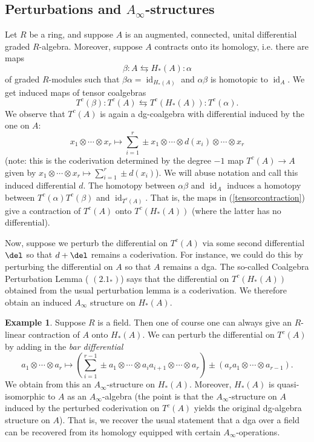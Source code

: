 \documentclass[12pt]{amsart}
\theoremstyle{definition}
\newtheorem{example}[lemma]{Example}
\theoremstyle{remark}
\newcommand{\id}{\operatorname{id}}
\begin{document}
\subsection{Perturbations and $A_\infty$-structures}
Let $R$ be a ring, and suppose $A$ is an augmented, connected, unital differential graded $R$-algebra. Moreover, suppose $A$ contracts onto its homology, i.e. there are maps
$$
\beta : A \leftrightarrows H_*(A) : \alpha
$$ 
of graded $R$-modules such that $\beta \alpha = \id_{H_*(A)}$ and $\alpha \beta$ is homotopic to $\id_A$. We get induced maps of tensor coalgebras
\begin{equation}
\label{tensorcontraction}
T^c(\beta) : T^c(A) \leftrightarrows T^c(H_*(A)) : T^c(\alpha).
\end{equation}
We observe that $T^c(A)$ is again a dg-coalgebra with differential induced by the one on $A$:
$$
x_1 \otimes \cdots \otimes x_r \mapsto \sum_{i = 1}^r \pm x_1 \otimes \cdots \otimes d(x_i) \otimes \cdots \otimes x_r
$$
(note: this is the coderivation determined by the degree $-1$ map $T^c(A) \to A$ given by $x_1 \otimes \cdots \otimes x_r \mapsto \sum_{i = 1}^r \pm d(x_i)$). We will abuse notation and call this induced differential $d$. The homotopy between $\alpha \beta$ and $\id_A$ induces a homotopy between $T^c(\alpha) T^c(\beta)$ and $\id_{T^c(A)}$. That is, the maps in (\ref{tensorcontraction}) give a contraction of $T^c(A)$ onto $T^c(H_*(A))$ (where the latter has no differential).

Now, suppose we perturb the differential on $T^c(A)$ via some second differential $\del$ so that $d + \del$ remains a coderivation. For instance, we could do this by perturbing the differential on $A$ so that $A$ remains a dga. The so-called Coalgebra Perturbation Lemma (\cite{HK} $(2.1_*)$) says that the differential on $T^c(H_*(A))$ obtained from the usual perturbation lemma is a coderivation. We therefore obtain an induced $A_\infty$ structure on $H_*(A)$.

\begin{example}
Suppose $R$ is a field. Then one of course one can always give an $R$-linear contraction of $A$ onto $H_*(A)$. We can perturb the differential on $T^c(A)$ by adding in the \emph{bar differential}
$$
a_1 \otimes \cdots \otimes a_r \mapsto (\sum_{i = 1}^{r-1} \pm a_1 \otimes \cdots \otimes a_i a_{i+1} \otimes \cdots \otimes a_r)  \pm (a_r a_1 \otimes \cdots \otimes a_{r-1}).
$$
We obtain from this an $A_\infty$-structure on $H_*(A)$. Moreover, $H_*(A)$ is quasi-isomorphic to $A$ as an $A_\infty$-algebra (the point is that the $A_\infty$-structure on $A$ induced by the perturbed coderivation on $T^c(A)$ yields the original dg-algebra structure on $A$). That is, we recover the usual statement that a dga over a field can be recovered from its homology equipped with certain $A_\infty$-operations.
\end{example}
\end{document}
